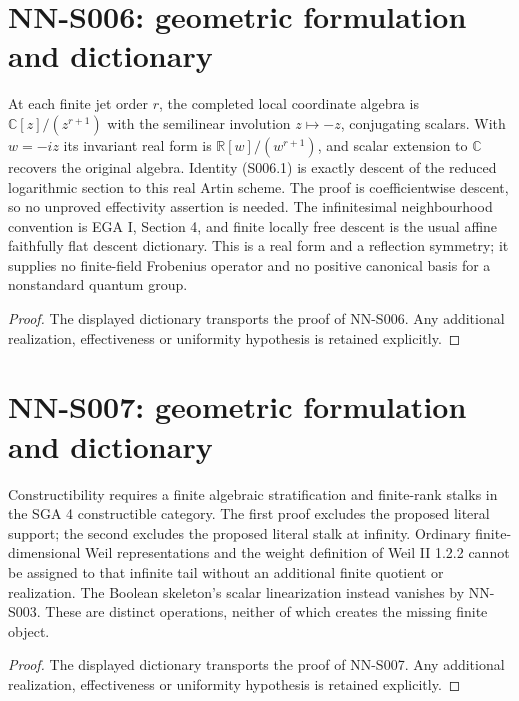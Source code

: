 \section{NN-S006: geometric formulation and dictionary}
\begin{geometricstatement}[NN-S006]
At each finite jet order $r$, the completed local coordinate
algebra is $\mathbb C[z]/(z^{r+1})$ with the semilinear involution
$z\mapsto-z$, conjugating scalars. With $w=-iz$ its invariant
real form is $\mathbb R[w]/(w^{r+1})$, and scalar extension to
$\mathbb C$ recovers the original algebra. Identity (S006.1)
is exactly descent of the reduced logarithmic section to this
real Artin scheme. The proof is coefficientwise descent, so no
unproved effectivity assertion is needed. The infinitesimal
neighbourhood convention is EGA I, Section 4, and finite locally
free descent is the usual affine faithfully flat descent
dictionary. This is a real form and a reflection symmetry;
it supplies no finite-field Frobenius operator and no positive
canonical basis for a nonstandard quantum group.
\end{geometricstatement}
\begin{proof} The displayed dictionary transports the proof of NN-S006. Any additional realization, effectiveness or uniformity hypothesis is retained explicitly.\end{proof}


\section{NN-S007: geometric formulation and dictionary}
\begin{geometricstatement}[NN-S007]
Constructibility requires a finite algebraic stratification and
finite-rank stalks in the SGA 4 constructible category. The first
proof excludes the proposed literal support; the second excludes
the proposed literal stalk at infinity. Ordinary finite-dimensional
Weil representations and the weight definition of Weil II 1.2.2
cannot be assigned to that infinite tail without an additional
finite quotient or realization. The Boolean skeleton's scalar
linearization instead vanishes by NN-S003. These are distinct
operations, neither of which creates the missing finite object.
\end{geometricstatement}
\begin{proof} The displayed dictionary transports the proof of NN-S007. Any additional realization, effectiveness or uniformity hypothesis is retained explicitly.\end{proof}


